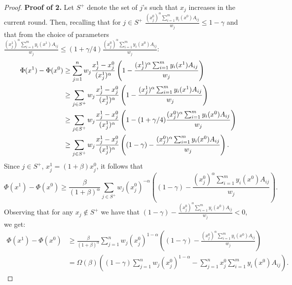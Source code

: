 \documentclass[11pt]{article}
\begin{document}
\begin{proof}
\noindent\textbf{Proof of 2.} Let $S^+$ denote the set of $j$'s such that $x_j$ increases in the current round. Then, recalling that for $j\in S^+$ $\frac{(x_j^0)^{\alpha}\sum_{i=1}^my_i(x^0)A_{ij}}{w_j}\leq 1- \gamma$ and that from the choice of parameters $\frac{(x_j^1)^{\alpha}\sum_{i=1}^my_i(x^1)A_{ij}}{w_j} \leq (1+\gamma/4)\frac{(x_j^0)^{\alpha}\sum_{i=1}^my_i(x^0)A_{ij}}{w_j}$:
\begin{align}
\Phi(x^1) - \Phi(x^0) &\geq \sum_{j=1}^n w_j \frac{x_j^1 - x_j^0}{(x_j^1)^{\alpha}}\left(1 - \frac{(x_j^1)^{\alpha}\sum_{i=1}^my_i(x^1)A_{ij}}{w_j} \right)\notag\\
&\geq \sum_{j\in S^+} w_j \frac{x_j^1 - x_j^0}{(x_j^1)^{\alpha}}\left(1 - \frac{(x_j^1)^{\alpha}\sum_{i=1}^my_i(x^1)A_{ij}}{w_j} \right)\notag\\
&\geq \sum_{j\in S^+} w_j \frac{x_j^1 - x_j^0}{(x_j^1)^{\alpha}}\left(1 - (1+\gamma/4)\frac{(x_j^0)^{\alpha}\sum_{i=1}^my_i(x^0)A_{ij}}{w_j} \right)\notag\\
&\geq \sum_{j\in S^+} w_j \frac{x_j^1 - x_j^0}{(x_j^1)^{\alpha}}\left((1 - \gamma) - \frac{(x_j^0)^{\alpha}\sum_{i=1}^my_i(x^0)A_{ij}}{w_j} \right). \notag \end{align}
Since $j\in S^+$, $x_j^1 = (1+\beta)x_j^0$, it follows that 
\begin{equation*}\Phi(x^1) - \Phi(x^0) \geq \frac{\beta}{(1+\beta)^{\alpha}}\sum_{j\in S^+} w_j (x_j^0)^{-\alpha}\left((1 - \gamma) - \frac{(x_j^0)^{\alpha}\sum_{i=1}^my_i(x^0)A_{ij}}{w_j} \right).
\end{equation*}
Observing that for any $x_j\notin S^+$ we have that $(1 - \gamma) - \frac{(x_j^0)^{\alpha}\sum_{i=1}^my_i(x^0)A_{ij}}{w_j}<0$, we get:
\begin{align*}
\Phi(x^1) - \Phi(x^0) &\geq \frac{\beta}{(1+\beta)^{\alpha}}\sum_{j=1}^n w_j (x_j^0)^{1-\alpha}\left((1 - \gamma) - \frac{(x_j^0)^{\alpha}\sum_{i=1}^my_i(x^0)A_{ij}}{w_j} \right)\\
&= \Omega(\beta)\left((1-\gamma)\sum_{j=1}^n w_j {(x_j^0)^{1-\alpha}} - \sum_{j=1}^nx_j^0\sum_{i=1}^m y_i(x^0) A_{ij} \right).
\end{align*}



\end{proof}
\end{document}
